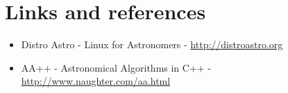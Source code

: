 \section{Links and references}

\begin{itemize}
    \item Distro Astro - Linux for Astronomers - \url{http://distroastro.org}
    \item AA++ - Astronomical Algorithms in C++ - \url{http://www.naughter.com/aa.html}
\end{itemize}
